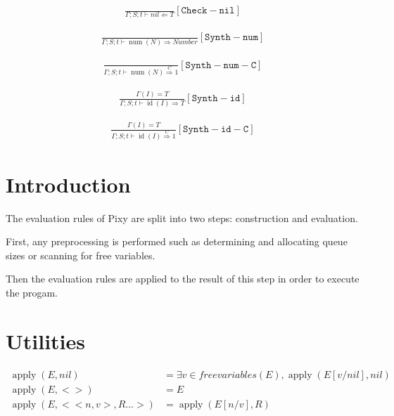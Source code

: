 \documentclass{scrartcl}
\DeclareMathOperator{\apply}{apply}
\DeclareMathOperator{\num}{num}
\DeclareMathOperator{\id}{id}
\begin{document}
    \begin{align*}
    \frac{}{
        \Gamma; S; t \vdash nil \Leftarrow T
    }[\mathtt{Check-nil}]
    \end{align*}
    
    \begin{align*}
    \frac{}{
        \Gamma; S; t \vdash \num(N) \Rightarrow Number
    }[\mathtt{Synth-num}]
    \end{align*}
    
    \begin{align*}
    \frac{}{
        \Gamma; S; t \vdash \num(N) \overset{C}{\Rightarrow} 1
    }[\mathtt{Synth-num-C}]
    \end{align*}
    
    \begin{align*}
    \frac{
        \Gamma(I) = T
    }{
        \Gamma; S; t \vdash \id(I) \Rightarrow T
    }[\mathtt{Synth-id}]
    \end{align*}
    
    \begin{align*}
    \frac{
        \Gamma(I) = T
    }{
        \Gamma; S; t \vdash \id(I) \overset{C}{\Rightarrow} 1
    }[\mathtt{Synth-id-C}]
    \end{align*}
    
    \section{Introduction}
    
    The evaluation rules of Pixy are split into two steps: construction and evaluation.
    
    First, any preprocessing is performed such as determining and allocating queue sizes or scanning for free variables.
    
    Then the evaluation rules are applied to the result of this step in order to execute the progam.
    
    \section{Utilities}
    
    \begin{align*}
        \apply(E, nil) & = \exists v \in freevariables(E), \apply(E[v/nil], nil) \\
        \apply(E, <>) & = E \\
        \apply(E, <<n, v>, R...>) & = \apply(E[n/v], R)
    \end{align*}
    
\end{document}
